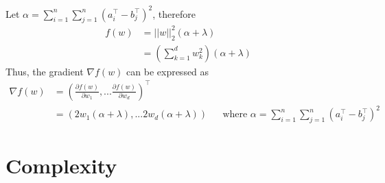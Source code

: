 \documentclass[11pt]{article}
\begin{document}
Let $\alpha = \sum_{i=1}^{n}\sum_{j=1}^{n} (a_i^\top - b_j^\top)^2$, therefore \\
\begin{align*}
f(w) & = ||w||_2^2 (\alpha + \lambda) \\
& = (\sum_{k=1}^{d} w_k^2)(\alpha + \lambda)
\end{align*}
Thus, the gradient $\nabla f(w)$ can be expressed as
\begin{align*}
\nabla f(w) & = (\frac{\partial f(w)}{\partial w_1}, ... \frac{\partial f(w)}{\partial w_d})^\top \\
& = (2w_1(\alpha + \lambda), ... 2w_d (\alpha + \lambda)) && \text{where } \alpha = \sum_{i=1}^{n}\sum_{j=1}^{n} (a_i^\top - b_j^\top)^2
\end{align*}
\newpage

\section{Complexity}
\end{document}
